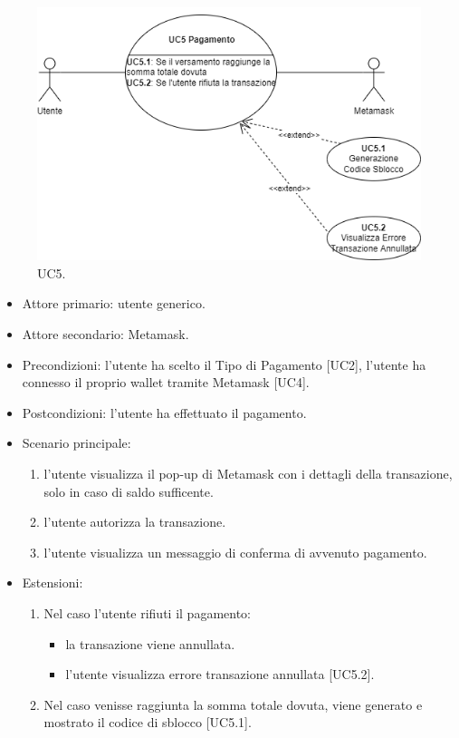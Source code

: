 \begin{figure}[H]
    \centering
    \includegraphics[scale=0.7]{immagini/UseCases-UC5.png}
    \caption{UC5.}
  \end{figure}

\begin{itemize}
    \item Attore primario: utente generico.
    \item Attore secondario: Metamask.
    \item Precondizioni: l'utente ha scelto il Tipo di Pagamento [UC2], l'utente ha connesso il proprio wallet tramite Metamask [UC4].
    \item Postcondizioni: l'utente ha effettuato il pagamento.
    \item Scenario principale: \begin{enumerate}
        \item l'utente visualizza il pop-up di Metamask con i dettagli della transazione, solo in caso di saldo sufficente.
        \item l'utente autorizza la transazione.
        \item l'utente visualizza un messaggio di conferma di avvenuto pagamento.
    \end{enumerate}
    \item Estensioni: \begin{enumerate}
        \item Nel caso l'utente rifiuti il pagamento: \begin{itemize}
            \item la transazione viene annullata.
            \item l'utente visualizza errore transazione annullata [UC5.2].
        \end{itemize}
        \item Nel caso venisse raggiunta la somma totale dovuta, viene generato e mostrato il codice di sblocco [UC5.1].
    \end{enumerate}
\end{itemize}

